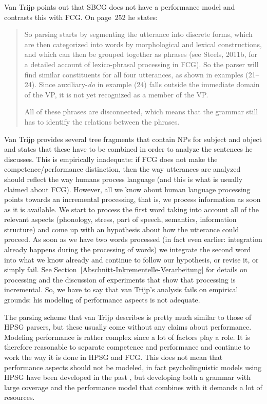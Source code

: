 Van Trijp points out that SBCG does not have a performance model and contrasts this with FCG. On
page~252 he states:
\begin{quote}
So parsing starts by segmenting the utterance
into discrete forms, which are then categorized into words by morphological
and lexical constructions, and which can then be grouped together as
phrases (see Steels, 2011b, for a detailed account of lexico-phrasal
processing in FCG). So the parser will find similar constituents for all
four utterances, as shown in examples (21--24). Since auxiliary-\emph{do} in
example (24) falls outside the immediate domain of the VP, it is not yet
recognized as a member of the VP.

All of these phrases are disconnected, which means that the grammar
still has to identify the relations between the phrases. \citep[]{vanTrijp2014a}
\end{quote}
Van Trijp provides several tree fragments that contain NPs for subject and object and states that
these have to be combined in order to analyze the sentences he discusses. This is empirically
inadequate: if FCG does not make the competence/performance distinction, then the way utterances are
analyzed should reflect the way humans process language (and this is what is usually claimed about FCG). However, all we know about human language
processing points towards an incremental processing, that is, we process information as soon as it
is available. We start to process the first word taking into account all of the relevant aspects
(phonology, stress, part of speech, semantics, information structure) and come up with an hypothesis
about how the utterance could proceed. As soon as we have two
words processed (in fact even earlier: integration already happens during the processing of words) we integrate the second word
into what we know already and continue to follow our hypothesis, or revise it, or simply fail. See
Section~\ref{Abschnitt-Inkrementelle-Verarbeitung} for details on processing and the discussion of
experiments that show that processing is incremental. So, we have to say that van Trijp's analysis
fails on empirical grounds: his modeling of performance aspects is not adequate.

The parsing scheme that van Trijp describes is pretty much similar to those of HPSG parsers, but
these usually come without any claims about performance. Modeling performance is rather complex
since a lot of factors play a role. It is therefore reasonable to separate competence and
performance and continue to work the way it is done in HPSG and FCG. This does not mean that
performance aspects should not be modeled, in fact psycholinguistic models using HPSG have been
developed in the past \citep{Konieczny96a-u}, but developing both a grammar with large coverage and
the performance model that combines with it demands a lot of resources.

